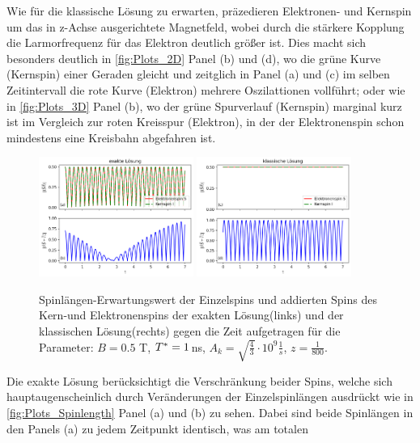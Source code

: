 Wie für die klassische Lösung zu erwarten, präzedieren Elektronen- und Kernspin um das in z-Achse ausgerichtete Magnetfeld, wobei durch die stärkere Kopplung
die Larmorfrequenz für das Elektron deutlich größer ist. Dies macht sich besonders deutlich in \autoref{fig:Plots_2D} Panel (b) und (d), wo die grüne 
Kurve (Kernspin) einer Geraden gleicht und zeitglich in Panel (a) und (c) im selben Zeitintervall die rote Kurve (Elektron) mehrere Oszilattionen vollführt; 
oder wie in \autoref{fig:Plots_3D} Panel (b), wo der grüne Spurverlauf (Kernspin) marginal kurz ist im Vergleich zur roten Kreisspur (Elektron), 
in der der Elektronenspin schon mindestens eine Kreisbahn abgefahren ist.\\ 
\begin{figure}[h]
    \centering
    \includegraphics[width = 0.45\textwidth]{Abbildungen/Plot_Spin_length_index.png}
    \includegraphics[width = 0.45\textwidth]{Abbildungen/Plot_Spin_length_Klassisch_index.png}
    \caption{Spinlängen-Erwartungswert der Einzelspins und addierten Spins des Kern-und Elektronenspins der exakten Lösung(links) und der klassischen 
    Lösung(rechts) gegen die Zeit aufgetragen für die Parameter: $B = 0.5$ T, $T^*= 1 \thinspace$ns, $A_k = \sqrt{\frac{4}{3}}\cdot 10^9 \frac{1}{s}$,
    $z=\frac{1}{800}$.}
    \label{fig:Plots_Spinlength}
\end{figure}
\noindent Die exakte Lösung berücksichtigt die Verschränkung beider Spins, welche sich hauptaugenscheinlich durch Veränderungen der Einzelspinlängen ausdrückt 
wie in \autoref{fig:Plots_Spinlength} Panel (a) und (b) zu sehen. Dabei sind beide Spinlängen in den Panels (a)  zu jedem Zeitpunkt identisch, was am totalen 
